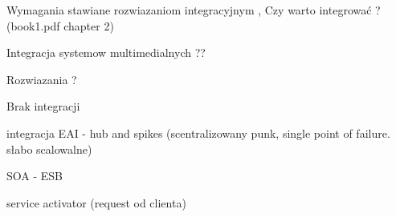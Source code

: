 Wymagania stawiane rozwiazaniom integracyjnym , Czy warto integrować ? (book1.pdf chapter 2)

Integracja systemow multimedialnych ??

Rozwiazania ?

Brak integracji

integracja EAI - hub and spikes (scentralizowany punk, single point of failure. słabo scalowalne)

SOA - ESB 




service activator (request od clienta)



